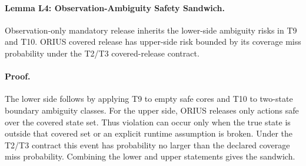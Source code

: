\paragraph{Lemma L4: Observation-Ambiguity Safety Sandwich.}
Observation-only mandatory release inherits the lower-side ambiguity risks in
T9 and T10. ORIUS covered release has upper-side risk bounded by its coverage
miss probability under the T2/T3 covered-release contract.

\paragraph{Proof.}
The lower side follows by applying T9 to empty safe cores and T10 to two-state
boundary ambiguity classes. For the upper side, ORIUS releases only actions
safe over the covered state set. Thus violation can occur only when the true
state is outside that covered set or an explicit runtime assumption is broken.
Under the T2/T3 contract this event has probability no larger than the
declared coverage miss probability. Combining the lower and upper statements
gives the sandwich.
